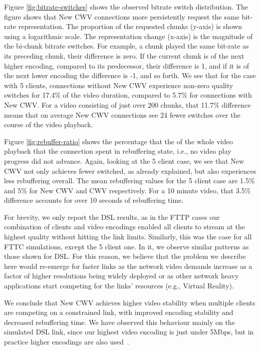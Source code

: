 \documentclass[10pt,sigconf,anonymous]{acmart}
\begin{document}
Figure \ref{fig:bitrate-switches} shows the observed bitrate switch distribution. The figure shows that New CWV connections more persistently request the same bit-rate representation. The proportion of the requested chunks (y-axis) is shown using a logarithmic scale. The representation change (x-axis) is the magnitude of the bi-chunk bitrate switches. For example, a chunk played the same bit-rate as its preceding chunk, their difference is zero. If the current chunk is of the next higher encoding, compared to its predecessor, their difference is 1, and if it is of the next lower encoding the difference is -1, and so forth. We see that for the case with 5 clients, connections without New CWV experience non-zero quality switches for 17.4\% of the video duration, compared to 5.7\% for connections with New CWV. For a video consisting of just over 200 chunks, that 11.7\% difference means that on average New CWV connections see 24 fewer switches over the course of the video playback.

Figure \ref{fig:rebuffer-ratio} shows the percentage that the of the whole video playback that the connection spent in rebuffering state, i.e., no video play progress did not advance. Again, looking at the 5 client case, we see that New CWV not only achieves fewer switched, as already explained, but also experiences less rebuffering overall. The mean rebuffering values for the 5 client case are 1.5\% and 5\% for New CWV and CWV respectively. For a 10 minute video, that 3.5\% difference accounts for over 10 seconds of rebuffering time.


For brevity, we only report the DSL results, as in the FTTP cases our combination of clients and video encodings enabled all clients to stream at the highest quality without hitting the link limits. Similarly, this was the case for all FTTC simulations, except the 5 client one. In it, we observe similar patterns as those shown for DSL. For this reason, we believe that the problem we describe here would re-emerge for faster links as the network video demands increase as a factor of higher resolutions being widely deployed or as other network heavy applications start competing for the links' resources (e.g., Virtual Reality).

We conclude that New CWV achieves higher video stability when multiple clients are competing on a constrained link, with improved encoding stability and decreased rebuffering time. We have observed this behaviour mainly on the simulated DSL link, since our highest video encoding is just under 5Mbps, but in practice higher encodings are also used~\cite{online-youtube-encodings}.
\end{document}
